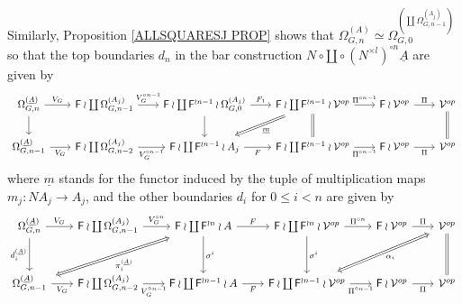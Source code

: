 \documentclass[a4paper,10pt]{article}%
\begin{document}
Similarly, Proposition \ref{ALLSQUARESJ PROP} shows that
$\Omega_{G,n}^{(A)} \simeq
\Omega_{G,0}^{\left( \coprod \Omega_{G,n-1}^{(A_j)} \right)}$
so that the top boundaries $d_n$ in the bar construction
$N \circ \amalg \circ (N^{\times l})^{\circ n} \underline{A}$
are given by
\begin{equation}
  \begin{tikzcd}[column sep=2em]
    \Omega_{G,n}^{(\underline{A})} \ar{d} \ar{r}{V_G} &
    \Fin \wr \coprod \Omega_{G,n-1}^{(A_j)} \ar{r}{V_G^{\circ n-1}}&
    \Fin \wr \coprod \Fin^{\wr n-1} \wr \Omega_{G,0}^{(A_j)} \ar{r}{F_1} \ar{d}&
    |[alias=dog2]|
    \Fin \wr \coprod \Fin^{\wr n-1} \wr \mathcal{V}^{op} \ar{r}{\Pi^{\circ n-1}}  \ar[equal]{d} &
    \Fin \wr \mathcal{V}^{op} \ar{r}{\Pi} &
    \mathcal{V}^{op} \ar[equal]{d}
    \\
    \Omega_{G,n-1}^{(\underline{A})} \ar{r}[swap]{V_G} &
    \Fin \wr \coprod \Omega_{G,n-2}^{(A_j)} \ar{r}[swap]{V_G^{\circ n-1}}&
    |[alias=cat3]|
    \Fin \wr \coprod \Fin^{\wr n-1} \wr A_j \ar{r}[swap]{F} &
    \Fin \wr \coprod \Fin^{\wr n-1} \wr \mathcal{V}^{op} \ar{r}[swap]{\Pi^{\circ n-1}} &
    \Fin \wr \mathcal{V}^{op} \ar{r}[swap]{\Pi} &
    |[alias=dog]|
    \mathcal{V}^{op}
    \arrow[Rightarrow, from=dog2, to=cat3,shorten <=0.15cm,,shorten >=0.15cm,"\underline{m}"]
  \end{tikzcd}
\end{equation}
where $\underline{m}$ stands for the functor induced by the tuple of multiplication maps $m_j \colon N A_j \to A_j$, 
and the other boundaries $d_i$ for $0 \leq i < n$ are given by
\begin{equation}\label{DISJBARDN EQ}
  \begin{tikzcd}[column sep=2em,row sep=3em]
    \Omega_{G,n}^{(\underline{A})} 
    \ar{d}[swap]{d_i^{(\underline{A})}} \ar{r}{V_G} &
    \Fin \wr \coprod \Omega_{G,n-1}^{(A_j)} \ar{r}{V_G^{\circ n}} &
    |[alias=dog2]|
    \Fin \wr \coprod \Fin^{\wr n} \wr A \ar{r}{F} \ar{d}{\sigma^i}&
    \Fin \wr \coprod \Fin^{\wr n} \wr \mathcal{V}^{op} \ar{r}{\Pi^{\circ n}}  \ar{d}{\sigma^i} &
    \Fin \wr \mathcal{V}^{op} \ar{r}{\Pi} &
    |[alias=dog3]|
    \mathcal{V}^{op} \ar[equal]{d}
    \\
    |[alias=cat3]|
    \Omega_{G,n-1}^{(\underline{A})} \ar{r}[swap]{V_G} &
    \Fin \wr \coprod \Omega_{G,n-2}^{(A_j)} \ar{r}[swap]{V_G^{\circ n-1}}&
    \Fin \wr \coprod \Fin^{\wr n-1} \wr A \ar{r}[swap]{F} &
    |[alias=cat2]|
    \Fin \wr \coprod \Fin^{\wr n-1} \wr \mathcal{V}^{op} \ar{r}[swap]{\Pi^{\circ n-1}} &
    \Fin \wr \mathcal{V}^{op} \ar{r}[swap]{\Pi} &
    \mathcal{V}^{op}
    \arrow[Leftrightarrow, from=dog2, to=cat3,shorten <=0.15cm,,shorten >=0.15cm,"\pi_i^{(\underline{A})}"]
    \arrow[Leftrightarrow, from=dog3, to=cat2,shorten <=0.15cm,,shorten >=0.15cm,"\alpha_i"]
  \end{tikzcd}
\end{equation}
\end{document}

